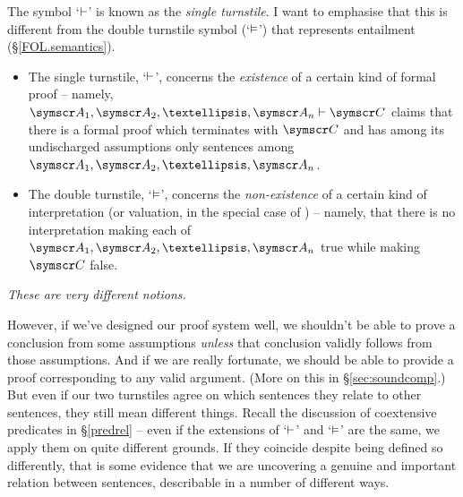 The symbol `$\vdash$' is known as the \emph{single turnstile}. I want to emphasise that this is different from the {double turnstile} symbol (`$\vDash$') that represents entailment (§\ref{FOL.semantics}). \begin{itemize}
	\item The single turnstile, `$\vdash$', concerns the \emph{existence} of a certain kind of formal proof – namely, $\meta{A}_{1}, \meta{A}_{2}, …, \meta{A}_{n} \proves \meta{C}$ claims that there is a formal proof which terminates with $\meta{C}$ and has among its undischarged assumptions only sentences among $\meta{A}_{1}, \meta{A}_{2}, …, \meta{A}_{n}$.
	\item The double turnstile, `$\vDash$', concerns the \emph{non-existence} of a certain kind of interpretation (or valuation, in the special case of \TFL) – namely, that there is no interpretation making each of $\meta{A}_{1}, \meta{A}_{2}, …, \meta{A}_{n}$ true while making $\meta{C}$ false.
\end{itemize} \emph{These are very different notions.}

However, if we've designed our proof system well, we shouldn't be able to prove a conclusion from some assumptions \emph{unless} that conclusion validly follows from those assumptions. And if we are really fortunate, we should be able to provide a proof corresponding to any valid argument. (More on this in §\ref{sec:soundcomp}.) But even if our two turnstiles agree on which sentences they relate to other sentences, they still mean different things. Recall the discussion of coextensive predicates in §\ref{predrel} – even if the extensions of `$\vdash$' and `$\vDash$' are the same, we apply them on quite different grounds. If they coincide despite being defined so differently, that is some evidence that we are uncovering a genuine and important relation between sentences, describable in a number of different ways.

